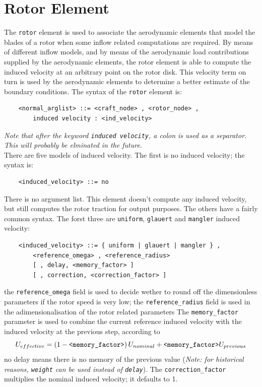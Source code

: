 \section{Rotor Element}
The \texttt{rotor} element is used to associate the aerodynamic elements that
model the blades of a rotor when some inflow related computations are
required. By means of different inflow models, and by means of the
aerodynamic load contributions supplied by the aerodynamic elements, the
rotor element is able to compute the induced velocity at an arbitrary point on
the rotor disk. This velocity term on turn is used by the aerodynamic
elements to determine a better estimate of the boundary conditions.
The syntax of the \texttt{rotor} element is:
\begin{verbatim}
    <normal_arglist> ::= <craft_node> , <rotor_node> ,
        induced velocity : <ind_velocity>
\end{verbatim}
{\em 
    Note that after the keyword \texttt{induced velocity}, a colon is used as a
    separator. This will probably be elminated in the future.
} \\
There are five models of induced velocity. 
The first is no induced velocity; the syntax is:
\begin{verbatim}
    <induced_velocity> ::= no
\end{verbatim}
There is no argument list. This element doesn't compute any induced
velocity, but still computes the rotor traction for output purposes.
The others have a fairly common syntax. The forst three are
\texttt{uniform}, \texttt{glauert} and \texttt{mangler} induced velocity:
\begin{verbatim}
    <induced_velocity> ::= { uniform | glauert | mangler } , 
        <reference_omega> , <reference_radius> 
        [ , delay, <memory_factor> ]
        [ , correction, <correction_factor> ]
\end{verbatim}
the \texttt{reference\_omega} field is used to decide wether to round off the
dimensionless parameters if the rotor speed is very low; the
\texttt{reference\_radius} field is used in the adimensionalisation of the
rotor related parameters
The \texttt{memory\_factor} parameter is used to
combine the current reference induced velocity with the induced velocity
at the previous step, according to
\begin{displaymath}
	U_{effective} = \left( 1 - \texttt{<memory\_factor>} \right) U_{nominal}
			+ \texttt{<memory\_factor>} U_{previous}
\end{displaymath}
no delay means there is no memory of the previous value 
(\emph{Note: for historical reasons, \texttt{weight} can be used 
instead of \texttt{delay}}).
The \texttt{correction\_factor} multiplies the nominal induced velocity;
it defaults to 1.

